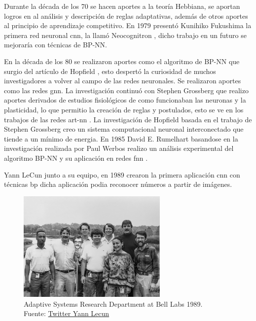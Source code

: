Durante la década de los 70 se hacen aportes a la teoría Hebbiana, se aportan logros en al análisis y descripción de reglas adaptativas, además de otros aportes al principio de aprendizaje competitivo.
En 1979 presentó {Kunihiko Fukushima} la primera red neuronal \acrshort{cnn}, la llamó Neocognitron \cite{fukushima1979neural}, dicho trabajo en un futuro se mejoraría con técnicas de \gls{BP-NN}.


En la década de los 80 se realizaron aportes como el algoritmo de \gls{BP-NN} que surgio del artículo de {Hopfield} \cite{hopfield1982neural}, esto despertó la curiosidad de muchos investigadores a volver al campo de las redes neuronales.
Se realizaron aportes como las redes \acrshort{gnn}.
La investigación continuó con {Stephen Grossberg} que realizo aportes derivados de estudios fisiológicos de como funcionaban las neuronas y la plasticidad, lo que permitio la creación de reglas y postulados, esto se ve en los trabajos de las redes \acrshort{art-nn} \cite{grossberg1987competitive}.
La investigación de {Hopfield} basada en el trabajo de {Stephen Grossberg} creo un sistema computacional neuronal interconectado que tiende a un mínimo de energia.
En 1985 {David E. Rumelhart} basandose en la investigación realizada por {Paul Werbos} \cite{etde_5080493} realizo un análisis experimental del algoritmo \gls{BP-NN} y su aplicación en redes \acrshort{fnn} \cite{rumelhart1985learning}.

{Yann LeCun} junto a su equipo, en 1989 crearon la primera aplicación \acrshort{cnn} con técnicas \acrshort{bp} dicha aplicación podia reconocer números a partir de imágenes.

\begin{figure}[H]
  \centering
  \includegraphics[width=0.65\textwidth]{figures/yann-lecun - EyIwmEDW8AIQs1C.jpeg}
  \caption{Adaptive Systems Research Department at Bell Labs 1989. \\Fuente: \href{https://twitter.com/ylecun/status/1378718317695934465}{Twitter Yann Lecun}}
  \label{fig:adaptive-systems-research-department-at-bell-labs}
\end{figure}


